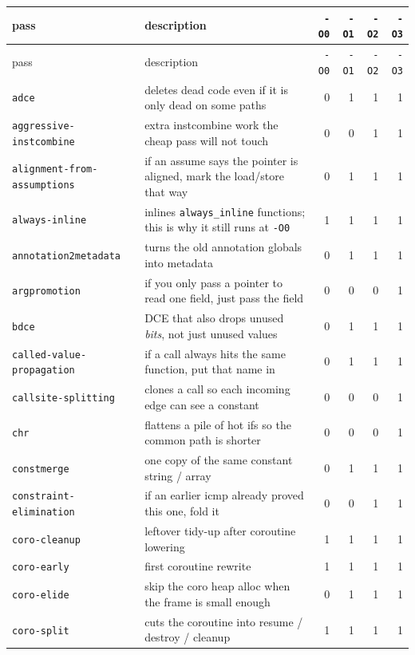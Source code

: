 \documentclass[11pt,a4paper]{article}
\begin{document}
{\small
\begin{longtable}{lp{5.6cm}rrrr}
\hline
pass & description & \texttt{-O0} & \texttt{-O1} & \texttt{-O2} & \texttt{-O3} \\
\hline
\endfirsthead
\hline
pass & description & \texttt{-O0} & \texttt{-O1} & \texttt{-O2} & \texttt{-O3} \\
\hline
\endhead
\texttt{adce} & deletes dead code even if it is only dead on some paths & 0 & 1 & 1 & 1 \\
\texttt{aggressive-instcombine} & extra instcombine work the cheap pass will not touch & 0 & 0 & 1 & 1 \\
\texttt{alignment-from-assumptions} & if an assume says the pointer is aligned, mark the load/store that way & 0 & 1 & 1 & 1 \\
\texttt{always-inline} & inlines \texttt{always\_inline} functions; this is why it still runs at \texttt{-O0} & 1 & 1 & 1 & 1 \\
\texttt{annotation2metadata} & turns the old annotation globals into metadata & 0 & 1 & 1 & 1 \\
\texttt{argpromotion} & if you only pass a pointer to read one field, just pass the field & 0 & 0 & 0 & 1 \\
\texttt{bdce} & DCE that also drops unused \emph{bits}, not just unused values & 0 & 1 & 1 & 1 \\
\texttt{called-value-propagation} & if a call always hits the same function, put that name in & 0 & 1 & 1 & 1 \\
\texttt{callsite-splitting} & clones a call so each incoming edge can see a constant & 0 & 0 & 0 & 1 \\
\texttt{chr} & flattens a pile of hot ifs so the common path is shorter & 0 & 0 & 0 & 1 \\
\texttt{constmerge} & one copy of the same constant string / array & 0 & 1 & 1 & 1 \\
\texttt{constraint-elimination} & if an earlier icmp already proved this one, fold it & 0 & 0 & 1 & 1 \\
\texttt{coro-cleanup} & leftover tidy-up after coroutine lowering & 1 & 1 & 1 & 1 \\
\texttt{coro-early} & first coroutine rewrite & 1 & 1 & 1 & 1 \\
\texttt{coro-elide} & skip the coro heap alloc when the frame is small enough & 0 & 1 & 1 & 1 \\
\texttt{coro-split} & cuts the coroutine into resume / destroy / cleanup & 1 & 1 & 1 & 1 \\

\end{longtable}}
\end{document}
